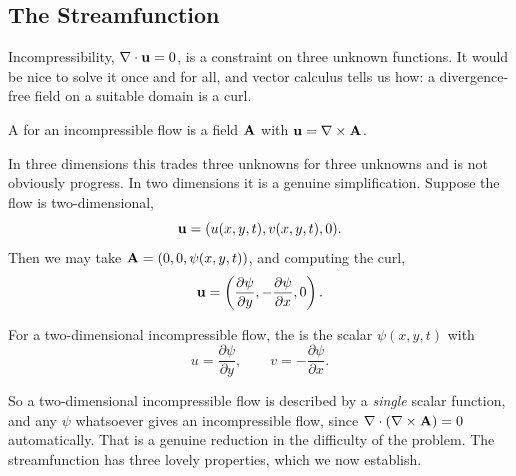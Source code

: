 \documentclass[a4paper]{scrartcl}
\newcommand{\pd}[2]{\frac{\partial #1}{\partial #2}}
\begin{document}
\subsection{The Streamfunction}

Incompressibility, $\nabla \cdot \mathbf{u} = 0$, is a constraint on three unknown functions. It would be nice to solve it once and for all, and vector calculus tells us how: a divergence-free field on a suitable domain is a curl.

\begin{definition}
	A  for an incompressible flow is a field $\mathbf{A}$ with $\mathbf{u} = \nabla \times \mathbf{A}$.
\end{definition}

In three dimensions this trades three unknowns for three unknowns and is not obviously progress. In two dimensions it is a genuine simplification. Suppose the flow is two-dimensional,
$$
\mathbf{u} = (u(x, y, t), v(x, y, t), 0).
$$
Then we may take $\mathbf{A} = (0, 0, \psi(x, y, t))$, and computing the curl,
$$
\vv u = \left( \pd{\psi}{y}, -\pd{\psi}{x}, 0\right).
$$

\begin{definition}[Streamfunction]
	For a two-dimensional incompressible flow, the  is the scalar $\psi(x, y, t)$ with
	$$
	u = \pd{\psi}{y}, \qquad v = -\pd{\psi}{x}.
	$$
\end{definition}

So a two-dimensional incompressible flow is described by a \emph{single} scalar function, and any $\psi$ whatsoever gives an incompressible flow, since $\nabla \cdot (\nabla \times \mathbf{A}) = 0$ automatically. That is a genuine reduction in the difficulty of the problem. The streamfunction has three lovely properties, which we now establish.
\end{document}
